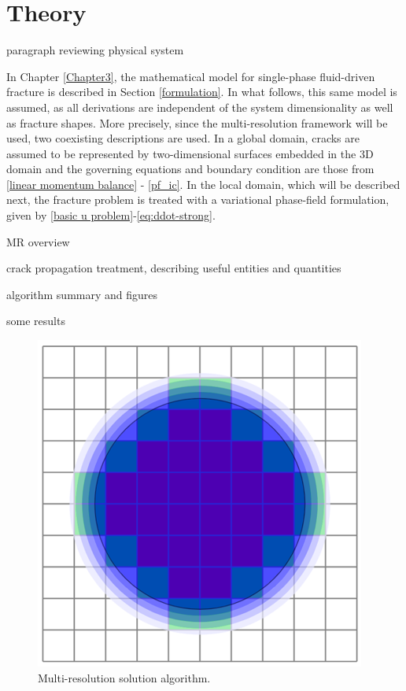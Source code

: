 \section{Theory}
\label{section: Chapter4/theory}

paragraph reviewing physical system

In Chapter \ref{Chapter3}, the mathematical model for single-phase fluid-driven fracture is described in Section \ref{formulation}. In what follows, this same model is assumed, as all derivations are independent of the system dimensionality as well as fracture shapes. More precisely, since the multi-resolution framework will be used, two coexisting descriptions are used. In a global domain, cracks are assumed to be represented by two-dimensional surfaces embedded in the 3D domain and the governing equations and boundary condition are those from \eqref{linear momentum balance} - \eqref{pf_ic}. In the local domain, which will be described next, the fracture problem is treated with a variational phase-field formulation, given by \eqref{basic u problem}-\eqref{eq:ddot-strong}.

MR overview

crack propagation treatment, describing useful entities and quantities

algorithm summary and figures

some results

\begin{figure}[h]
    \centering
    \includegraphics[width=0.5\linewidth]{Chapter4/figures/blue_circle.png}
    \caption{Multi-resolution solution algorithm.}
    \label{fig:lorem1}
\end{figure}


